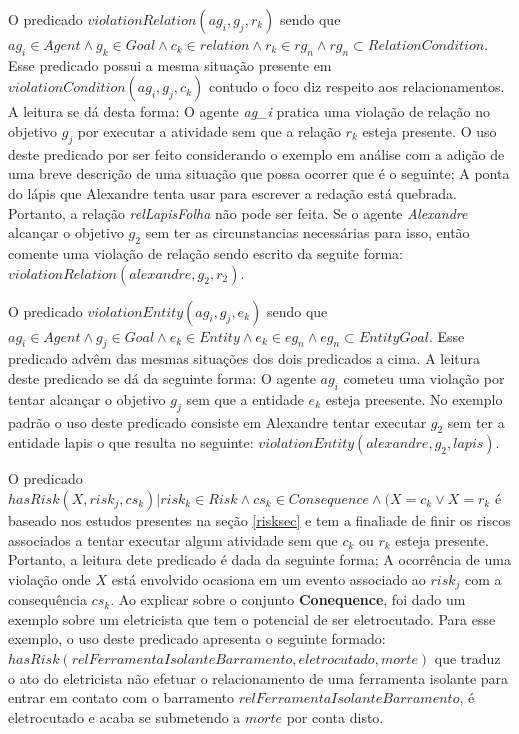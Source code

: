 O predicado $ violationRelation(ag_i,g_j,r_k) $ sendo que $ ag_i \in Agent \wedge g_k \in Goal \wedge c_k \in relation \wedge r_k  \in rg_n \wedge rg_n \subset RelationCondition $.
Esse predicado possui a mesma situação presente em $ violationCondition(ag_i,g_j,c_k) $ contudo o foco diz respeito aos relacionamentos.
A leitura se dá desta forma: O agente \textit{ag\_i} pratica uma violação de relação no objetivo $g_j$ por executar a atividade 
sem que a relação $r_k$ esteja presente. O uso deste predicado por ser feito considerando o exemplo em análise com a adição de uma breve 
descrição de uma situação que possa ocorrer que é o seguinte; A ponta do lápis que Alexandre tenta usar para escrever a redação está 
quebrada. Portanto, a relação \textit{relLapisFolha} não pode ser feita. Se o agente \textit{Alexandre} alcançar o objetivo $g_2$ sem ter 
as circunstancias necessárias para isso, então comente uma violação de relação sendo escrito da seguite forma: $violationRelation(alexandre,g_2,r_2)$.

O predicado $ violationEntity(ag_i,g_j,e_k) $ sendo que $ag_i \in Agent \wedge g_j \in Goal \wedge e_k \in Entity \wedge e_k \in eg_n \wedge eg_n \subset EntityGoal $.
Esse predicado advêm das mesmas situações dos dois predicados a cima. A leitura deste predicado se dá da seguinte forma: O agente 
$ag_i$ cometeu uma violação por tentar alcançar o objetivo $g_j$ sem que a entidade $e_k$ esteja preesente. No exemplo padrão o uso 
deste predicado consiste em Alexandre tentar executar $g_2$ sem ter a entidade lapis o que resulta no seguinte: $violationEntity(alexandre, g_2, lapis)$.

O predicado $ hasRisk(X, risk_j, cs_k) | risk_k \in Risk \wedge cs_k \in Consequence \wedge (X = c_k \vee X = r_k $ é baseado nos estudos 
presentes na seção \ref{risksec} e tem a finaliade de finir os riscos associados a tentar executar algum atividade sem que 
$c_k$ ou $r_k$ esteja presente. Portanto, a leitura dete predicado é dada da seguinte forma; A ocorrência de uma violação 
onde $X$ está envolvido ocasiona em um evento associado ao $risk_j$ com a consequência $cs_k$. Ao explicar sobre o conjunto 
\textbf{Conequence}, foi dado um exemplo sobre um eletricista que tem o potencial de ser eletrocutado. Para esse exemplo, 
o uso deste predicado apresenta o seguinte formado: $hasRisk(relFerramentaIsolanteBarramento, eletrocutado, morte)$ que traduz
o ato do eletricista não efetuar o relacionamento de uma ferramenta isolante para entrar em contato com o barramento $relFerramentaIsolanteBarramento$,
é eletrocutado e acaba se submetendo a $morte$ por conta disto.

